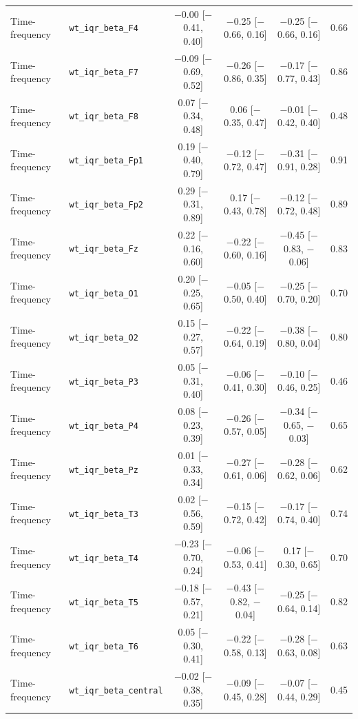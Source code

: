 {\begin{longtable}{llcccc}
Time-frequency & \texttt{wt\_iqr\_beta\_F4} & $-$0.00 [$-$0.41, 0.40] & $-$0.25 [$-$0.66, 0.16] & $-$0.25 [$-$0.66, 0.16] & 0.66 \\
Time-frequency & \texttt{wt\_iqr\_beta\_F7} & $-$0.09 [$-$0.69, 0.52] & $-$0.26 [$-$0.86, 0.35] & $-$0.17 [$-$0.77, 0.43] & 0.86 \\
Time-frequency & \texttt{wt\_iqr\_beta\_F8} & 0.07 [$-$0.34, 0.48] & 0.06 [$-$0.35, 0.47] & $-$0.01 [$-$0.42, 0.40] & 0.48 \\
Time-frequency & \texttt{wt\_iqr\_beta\_Fp1} & 0.19 [$-$0.40, 0.79] & $-$0.12 [$-$0.72, 0.47] & $-$0.31 [$-$0.91, 0.28] & 0.91 \\
Time-frequency & \texttt{wt\_iqr\_beta\_Fp2} & 0.29 [$-$0.31, 0.89] & 0.17 [$-$0.43, 0.78] & $-$0.12 [$-$0.72, 0.48] & 0.89 \\
Time-frequency & \texttt{wt\_iqr\_beta\_Fz} & 0.22 [$-$0.16, 0.60] & $-$0.22 [$-$0.60, 0.16] & $-$0.45 [$-$0.83, $-$0.06] & 0.83 \\
Time-frequency & \texttt{wt\_iqr\_beta\_O1} & 0.20 [$-$0.25, 0.65] & $-$0.05 [$-$0.50, 0.40] & $-$0.25 [$-$0.70, 0.20] & 0.70 \\
Time-frequency & \texttt{wt\_iqr\_beta\_O2} & 0.15 [$-$0.27, 0.57] & $-$0.22 [$-$0.64, 0.19] & $-$0.38 [$-$0.80, 0.04] & 0.80 \\
Time-frequency & \texttt{wt\_iqr\_beta\_P3} & 0.05 [$-$0.31, 0.40] & $-$0.06 [$-$0.41, 0.30] & $-$0.10 [$-$0.46, 0.25] & 0.46 \\
Time-frequency & \texttt{wt\_iqr\_beta\_P4} & 0.08 [$-$0.23, 0.39] & $-$0.26 [$-$0.57, 0.05] & $-$0.34 [$-$0.65, $-$0.03] & 0.65 \\
Time-frequency & \texttt{wt\_iqr\_beta\_Pz} & 0.01 [$-$0.33, 0.34] & $-$0.27 [$-$0.61, 0.06] & $-$0.28 [$-$0.62, 0.06] & 0.62 \\
Time-frequency & \texttt{wt\_iqr\_beta\_T3} & 0.02 [$-$0.56, 0.59] & $-$0.15 [$-$0.72, 0.42] & $-$0.17 [$-$0.74, 0.40] & 0.74 \\
Time-frequency & \texttt{wt\_iqr\_beta\_T4} & $-$0.23 [$-$0.70, 0.24] & $-$0.06 [$-$0.53, 0.41] & 0.17 [$-$0.30, 0.65] & 0.70 \\
Time-frequency & \texttt{wt\_iqr\_beta\_T5} & $-$0.18 [$-$0.57, 0.21] & $-$0.43 [$-$0.82, $-$0.04] & $-$0.25 [$-$0.64, 0.14] & 0.82 \\
Time-frequency & \texttt{wt\_iqr\_beta\_T6} & 0.05 [$-$0.30, 0.41] & $-$0.22 [$-$0.58, 0.13] & $-$0.28 [$-$0.63, 0.08] & 0.63 \\
Time-frequency & \texttt{wt\_iqr\_beta\_central} & $-$0.02 [$-$0.38, 0.35] & $-$0.09 [$-$0.45, 0.28] & $-$0.07 [$-$0.44, 0.29] & 0.45 \\

\end{longtable}}
